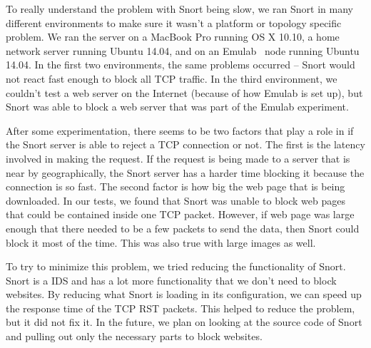 To really understand the problem with Snort being slow, we ran Snort in many
different environments to make sure it wasn't a platform or topology specific
problem. We ran the server on a MacBook Pro running OS X 10.10, a home network
server running Ubuntu 14.04, and on an Emulab~\cite{emulab} node running Ubuntu
14.04. In the first two environments, the same problems occurred -- Snort would
not react fast enough to block all TCP traffic. In the third environment, we
couldn't test a web server on the Internet (because of how Emulab is set up),
but Snort was able to block a web server that was part of the Emulab
experiment.

After some experimentation, there seems to be two factors that play a role in
if the Snort server is able to reject a TCP connection or not. The first is the
latency involved in making the request. If the request is being made to a
server that is near by geographically, the Snort server has a harder time
blocking it because the connection is so fast. The second factor is how big the
web page that is being downloaded. In our tests, we found that Snort was unable
to block web pages that could be contained inside one TCP packet. However, if
web page was large enough that there needed to be a few packets to send the
data, then Snort could block it most of the time. This was also true with large
images as well.

To try to minimize this problem, we tried reducing the functionality of Snort.
Snort is a IDS and has a lot more functionality that we don't need to block
websites. By reducing what Snort is loading in its configuration, we can speed
up the response time of the TCP RST packets. This helped to reduce the problem,
but it did not fix it. In the future, we plan on looking at the source code of
Snort and pulling out only the necessary parts to block websites.


